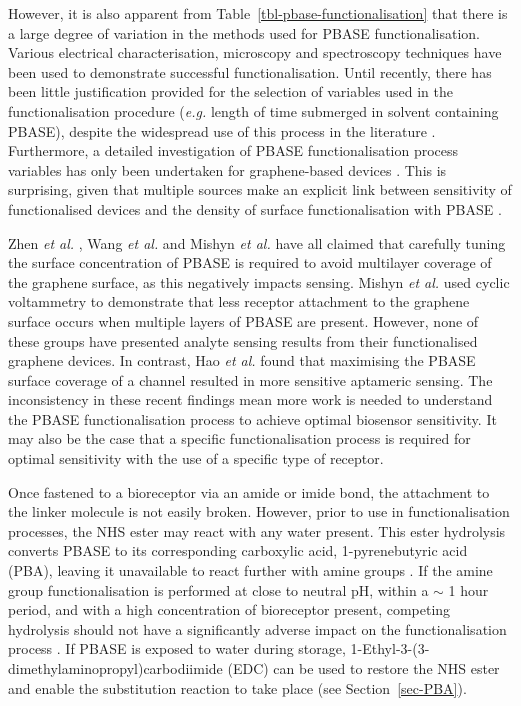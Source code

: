 \documentclass[
  a4paper,
]{scrbook}
\begin{document}
However, it is also apparent from
Table~\ref{tbl-pbase-functionalisation} that there is a large degree of
variation in the methods used for PBASE functionalisation. Various
electrical characterisation, microscopy and spectroscopy techniques have
been used to demonstrate successful functionalisation. Until recently,
there has been little justification provided for the selection of
variables used in the functionalisation procedure (\emph{e.g.} length of
time submerged in solvent containing PBASE), despite the widespread use
of this process in the literature
\autocite{Hinnemo2017,Zhen2018,Wang2020}. Furthermore, a detailed
investigation of PBASE functionalisation process variables has only been
undertaken for graphene-based devices
\autocite{Zhen2018,Hao2020,Wang2020,Mishyn2022}. This is surprising,
given that multiple sources make an explicit link between sensitivity of
functionalised devices and the density of surface functionalisation with
PBASE \autocite{White2008,Hermanson2013-3,Chen2014}.

Zhen \emph{et al.} \autocite{Zhen2018}, Wang \emph{et al.}
\autocite{Wang2020} and Mishyn \emph{et al.} \autocite{Mishyn2022} have
all claimed that carefully tuning the surface concentration of PBASE is
required to avoid multilayer coverage of the graphene surface, as this
negatively impacts sensing. Mishyn \emph{et al.} \autocite{Mishyn2022}
used cyclic voltammetry to demonstrate that less receptor attachment to
the graphene surface occurs when multiple layers of PBASE are present.
However, none of these groups have presented analyte sensing results
from their functionalised graphene devices. In contrast, Hao \emph{et
al.} \autocite{Hao2020} found that maximising the PBASE surface coverage
of a channel resulted in more sensitive aptameric sensing. The
inconsistency in these recent findings mean more work is needed to
understand the PBASE functionalisation process to achieve optimal
biosensor sensitivity. It may also be the case that a specific
functionalisation process is required for optimal sensitivity with the
use of a specific type of receptor.

Once fastened to a bioreceptor via an amide or imide bond, the
attachment to the linker molecule is not easily broken. However, prior
to use in functionalisation processes, the NHS ester may react with any
water present. This ester hydrolysis converts PBASE to its corresponding
carboxylic acid, 1-pyrenebutyric acid (PBA), leaving it unavailable to
react further with amine groups
\autocite{Hermanson2013-3,Hermanson2013-5,Mishyn2022}. If the amine
group functionalisation is performed at close to neutral pH, within a
\(\sim\) 1 hour period, and with a high concentration of bioreceptor
present, competing hydrolysis should not have a significantly adverse
impact on the functionalisation process \autocite{Hermanson2013-3}. If
PBASE is exposed to water during storage,
1-Ethyl-3-(3-dimethylaminopropyl)carbodiimide (EDC) can be used to
restore the NHS ester and enable the substitution reaction to take place
(see Section~\ref{sec-PBA}).
\end{document}
